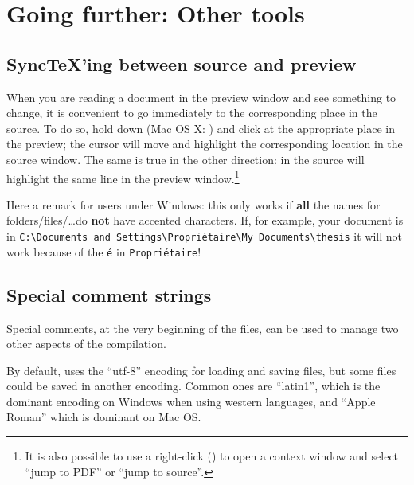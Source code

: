 
\chapter{Going further: Other tools}

\section{SyncTeX'ing between source and preview}
\label{sec.synctex}

When you are reading a document in the preview window and see something to change, it is convenient to go immediately to the corresponding place in the source. To do so, hold down  (Mac OS X: ) and click at the appropriate place in the preview; the cursor will move and highlight the corresponding location in the source window. The same is true in the other direction:  in the source will highlight the same line in the preview window.\footnote{It is also possible to use a right-click () to open a context window and select ``jump to PDF'' or ``jump to source''.}

\begin{OSWindows}
Here a remark for users under Windows: this only works if \textbf{all} the names for folders/files/\dots do \textbf{not} have accented characters. If, for example, your document is in \texttt{C:{\textbackslash}Documents and Settings{\textbackslash}Propriétaire{\textbackslash}My Documents{\textbackslash}thesis} it will not work because of the \verb|é| in \texttt{Propriétaire}!
\end{OSWindows}

\section{Special comment strings}

Special comments, at the very beginning of the files, can be used to manage two other aspects of the compilation.

By default, {\Tw} uses the ``utf-8'' encoding for loading and saving files, but some files could be saved in another encoding. Common ones are ``latin1'', which is the dominant encoding on Windows when using western languages, and ``Apple Roman'' which is dominant on Mac OS.

